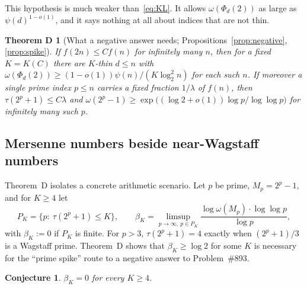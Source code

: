 \documentclass[11pt]{amsart}
\newtheorem{conjecture}[theorem]{Conjecture}
\newtheorem*{theoremD}{Theorem D}
\theoremstyle{definition}
\theoremstyle{remark}
\begin{document}
This hypothesis is much weaker than~\eqref{eq:KL}. It allows $\omega(\Phi_d(2))$ as large as $\psi(d)^{1-o(1)}$, and
it says nothing at all about indices that are not thin.

\begin{theoremD}[What a negative answer needs; Propositions~\ref{prop:negative}, \ref{prop:spike}]
If $f(2n)\le Cf(n)$ for infinitely many $n$, then for a fixed $K=K(C)$ there are $K$-thin
$d\le n$ with $\omega(\Phi_d(2))\ge(1-o(1))\psi(n)/(K\log_2^2n)$ for each such $n$. If moreover a single prime index $p\le n$ carries a fixed
fraction $1/\lambda$ of $f(n)$, then $\tau(2^p+1)\le C\lambda$ and
$\omega(2^p-1)\ge\exp\bigl((\log2+o(1))\log p/\log\log p\bigr)$ for infinitely many such $p$.
\end{theoremD}

\subsection{Mersenne numbers beside near-Wagstaff numbers}
Theorem~D isolates a concrete arithmetic scenario. Let $p$ be prime, $M_p=2^p-1$, and for $K\ge4$ let
\[
P_K=\{p:\ \tau(2^p+1)\le K\},\qquad
\beta_K=\limsup_{p\to\infty,\ p\in P_K}\frac{\log\omega(M_p)\cdot\log\log p}{\log p},
\]
with $\beta_K:=0$ if $P_K$ is finite. For $p>3$, $\tau(2^p+1)=4$ exactly when $(2^p+1)/3$ is a Wagstaff prime.
Theorem~D shows that $\beta_K\ge\log 2$ for some $K$ is necessary for the ``prime spike'' route to a negative answer
to Problem~\#893.

\begin{conjecture}\label{conj:beta}
$\beta_K=0$ for every $K\ge4$.
\end{conjecture}
\end{document}
